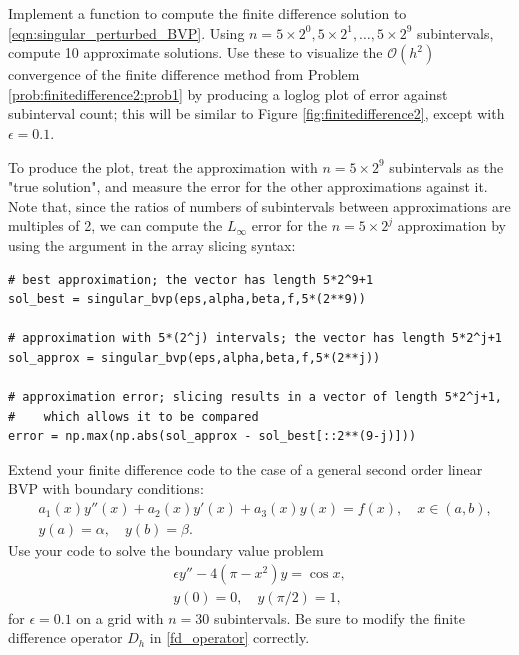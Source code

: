 \begin{problem}
Implement a function  to compute the finite difference solution to \ref{eqn:singular_perturbed_BVP}.
Using $n = 5 \times 2^0,5 \times 2^1, \dots ,5 \times 2^9$ subintervals, compute 10 approximate solutions. 
Use these to visualize the $\mathcal{O}(h^2)$ convergence of the finite difference method from Problem \ref{prob:finitedifference2:prob1} by producing a loglog plot of error against subinterval count; this will be similar to Figure \ref{fig:finitedifference2}, except with $\epsilon=0.1$.

To produce the plot, treat the approximation with $n = 5 \times 2^9$ subintervals as the "true solution", and measure the error for the other approximations against it. Note that, since the ratios of numbers of subintervals between approximations are multiples of 2, we can compute the $L_{\infty}$ error for the $n=5 \times 2^j$ approximation by using the  argument in the array slicing syntax:
\begin{lstlisting}
# best approximation; the vector has length 5*2^9+1
sol_best = singular_bvp(eps,alpha,beta,f,5*(2**9))

# approximation with 5*(2^j) intervals; the vector has length 5*2^j+1
sol_approx = singular_bvp(eps,alpha,beta,f,5*(2**j))

# approximation error; slicing results in a vector of length 5*2^j+1,
#    which allows it to be compared
error = np.max(np.abs(sol_approx - sol_best[::2**(9-j)]))
\end{lstlisting}
\end{problem}

\begin{problem}
Extend your finite difference code to the case of a general second order linear BVP with boundary conditions:
\begin{align*}
	&{ } a_1(x)y''(x) +a_2(x)y'(x)+ a_3(x) y(x) = f(x), \quad x \in (a,b),\\
	&{ } y(a) = \alpha, \quad y(b) = \beta.
\end{align*}
Use your code to solve the boundary value problem
\begin{align*}
	\epsilon y'' - 4(\pi - x^2)y = \cos x, \\
	y(0) = 0, \quad y(\pi/2) = 1,
\end{align*}
for $\epsilon = 0.1$ on a grid with $n=30$ subintervals.
\label{prob:finitedifference2:prob3}
Be sure to modify the finite difference operator $D_h$ in \eqref{fd_operator} correctly.

\end{problem}




